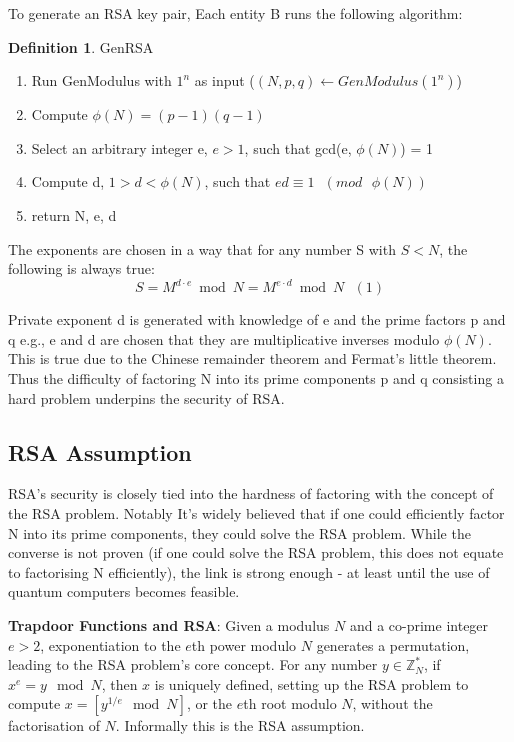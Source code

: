 \documentclass[]{final_report}
\theoremstyle{definition}
\newtheorem{definition}{Definition}[chapter]
\begin{document}
To generate an RSA key pair, Each entity B runs the following algorithm:

\begin{definition} GenRSA
\label{def:GenRSA}
\begin{mdframed}
\begin{enumerate}
    \item Run GenModulus with $1^n$ as input ($(N, p, q) \leftarrow GenModulus(1^n)$)
    \item Compute $\phi(N) = (p - 1)(q - 1)$
    \item Select an arbitrary integer e, $e > 1$, such that gcd(e, $\phi(N)$) = 1 
    \item Compute d, $1 > d < \phi(N)$, such that $ed \equiv 1 \text{ } (mod \text{ } \phi(N))$
    \item return N, e, d
\end{enumerate}
\end{mdframed}
\end{definition}

The exponents are chosen in a way that for any number S with $S < N$, the following is always true:
\[S = M^{d \cdot e} \bmod N = M^{e \cdot d} \bmod N \text{ } (1)\]

Private exponent d is generated with knowledge of e and the prime factors p and q e.g., e and d are chosen that they are multiplicative inverses modulo $\phi(N)$. This is true due to the Chinese remainder theorem and Fermat’s little theorem. Thus the difficulty of factoring N into its prime components p and q consisting a hard problem underpins the security of RSA. 

\subsection{RSA Assumption}
RSA's security is closely tied into the hardness of factoring with the concept of the RSA problem. Notably It's widely believed that if one could efficiently factor N into its prime components, they could solve the RSA problem. While the converse is not proven (if one could solve the RSA problem, this does not equate to factorising N efficiently), the link is strong enough - at least until the use of quantum computers becomes feasible.

\textbf{Trapdoor Functions and RSA}: Given a modulus \(N\) and a co-prime integer \(e > 2\), exponentiation to the \(e\)th power modulo \(N\) generates a permutation, leading to the RSA problem's core concept. For any number \(y \in \mathbb{Z}^*_{N}\), if \(x^e = y \mod N\), then \(x\) is uniquely defined, setting up the RSA problem to compute \(x = [y^{1/e} \mod N]\), or the \(e\)th root modulo \(N\), without the factorisation of \(N\). Informally this is the RSA assumption.
\end{document}

